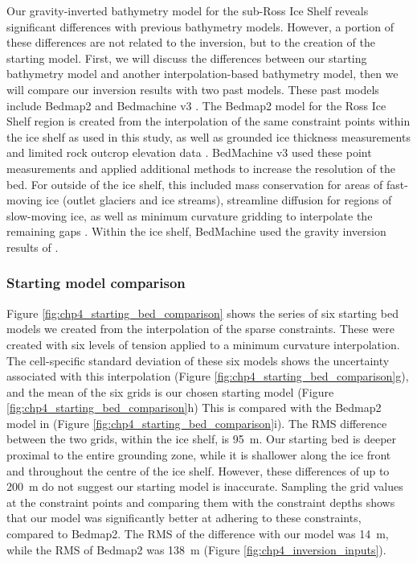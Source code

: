 Our gravity-inverted bathymetry model for the sub-Ross Ice Shelf reveals significant differences with previous bathymetry models. However, a portion of these differences are not related to the inversion, but to the creation of the starting model. First, we will discuss the differences between our starting bathymetry model and another interpolation-based bathymetry model, then we will compare our inversion results with two past models. These past models include Bedmap2 \citep{fretwellbedmap22013} and Bedmachine v3 \citep{morlighemdeep2020, morlighemmeasures2022}. The Bedmap2 model for the Ross Ice Shelf region is created from the interpolation of the same constraint points within the ice shelf as used in this study, as well as grounded ice thickness measurements and limited rock outcrop elevation data \citep{fretwellbedmap22013, lebrocqimproved2010, timmermannconsistent2010}. BedMachine v3 used these point measurements and applied additional methods to increase the resolution of the bed. For outside of the ice shelf, this included mass conservation for areas of fast-moving ice (outlet glaciers and ice streams), streamline diffusion for regions of slow-moving ice, as well as minimum curvature gridding to interpolate the remaining gaps \citep{morlighemdeep2020}. Within the ice shelf, BedMachine used the gravity inversion results of \citet{tintoross2019}.\\

\subsubsection{Starting model comparison}

Figure \ref{fig:chp4_starting_bed_comparison} shows the series of six starting bed models we created from the interpolation of the sparse constraints. These were created with six levels of tension applied to a minimum curvature interpolation. The cell-specific standard deviation of these six models shows the uncertainty associated with this interpolation (Figure \ref{fig:chp4_starting_bed_comparison}g), and the mean of the six grids is our chosen starting model (Figure \ref{fig:chp4_starting_bed_comparison}h) This is compared with the Bedmap2 model in (Figure \ref{fig:chp4_starting_bed_comparison}i). The RMS difference between the two grids, within the ice shelf, is 95~m. Our starting bed is deeper proximal to the entire grounding zone, while it is shallower along the ice front and throughout the centre of the ice shelf. However, these differences of up to 200~m do not suggest our starting model is inaccurate. Sampling the grid values at the constraint points and comparing them with the constraint depths shows that our model was significantly better at adhering to these constraints, compared to Bedmap2. The RMS of the difference with our model was 14~m, while the RMS of Bedmap2 was 138~m (Figure \ref{fig:chp4_inversion_inputs}).\\

